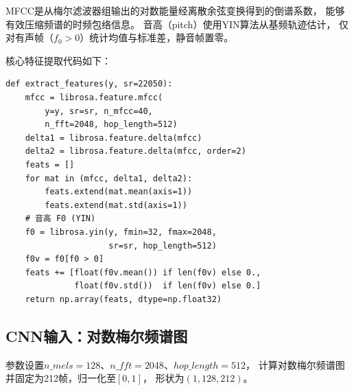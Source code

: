 \documentclass[10pt,twoside,twocolumn]{article}
\begin{document}
\begin{table}[h]
\caption{传统机器学习特征构成（278维）}
\label{tab:features}
\centering{}
\end{table}

MFCC是从梅尔滤波器组输出的对数能量经离散余弦变换得到的倒谱系数，
能够有效压缩频谱的时频包络信息\cite{mfcc1980}。
音高（pitch）使用YIN算法\cite{yin2002}从基频轨迹估计，
仅对有声帧（$f_0>0$）统计均值与标准差，静音帧置零。

核心特征提取代码如下：

\begin{lstlisting}[caption={特征提取核心代码（utils.py节选）}]
def extract_features(y, sr=22050):
    mfcc = librosa.feature.mfcc(
        y=y, sr=sr, n_mfcc=40,
        n_fft=2048, hop_length=512)
    delta1 = librosa.feature.delta(mfcc)
    delta2 = librosa.feature.delta(mfcc, order=2)
    feats = []
    for mat in (mfcc, delta1, delta2):
        feats.extend(mat.mean(axis=1))
        feats.extend(mat.std(axis=1))
    # 音高 F0 (YIN)
    f0 = librosa.yin(y, fmin=32, fmax=2048,
                     sr=sr, hop_length=512)
    f0v = f0[f0 > 0]
    feats += [float(f0v.mean()) if len(f0v) else 0.,
              float(f0v.std())  if len(f0v) else 0.]
    return np.array(feats, dtype=np.float32)
\end{lstlisting}

\subsection{CNN输入：对数梅尔频谱图}

参数设置$n\_mels=128$、$n\_fft=2048$、$hop\_length=512$，
计算对数梅尔频谱图并固定为212帧，归一化至$[0,1]$，
形状为$(1, 128, 212)$。
\end{document}
